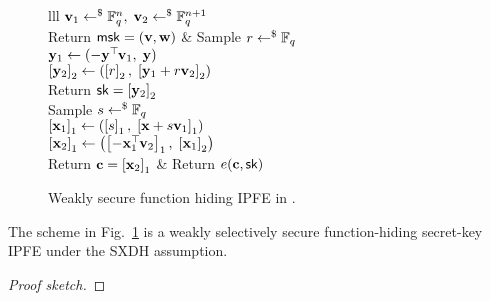 \begin{figure}[htb]
\centering
\begin{pcarray}{lll}
		{
			$\vc{v}_1 \rgets \F_q^n, \; \vc{v}_2 \rgets \F_q^{n+1}$
				\\
			Return $\msk = (\vc{v}, \vc{w})$
 		}
	&
		{
			Sample $r \rgets \F_q$
				\\
			$\vc{y}_1 \gets (-\vc{y}^\trs \vc{v}_1, \; \vc{y})$
				\\
			$\gexp{2}{\vc{y}_2} \gets \left(\gexp{2}{r}, \; \gexp{2}{\vc{y}_1 + r \vc{v}_2}\right)$
				\\
			Return $\sk = \gexp{2}{\vc{y}_2}$
		}
	\\
		{
			Sample $s \rgets \F_q$
				\\
			$\gexp{1}{\vc{x}_1} \gets \left( \gexp{1}{s},\; \gexp{1}{\vc{x} + s \vc{v}_1} \right)$
				\\
			$\gexp{1}{\vc{x}_2} \gets \left( \gexp{1}{-\vc{x}_1^\trs \vc{v}_2},\; \gexp{2}{\vc{x}_1} \right)$
				\\
			Return $\vc{c} = \gexp{1}{\vc{x}_2}$
		}
	&
		{
			Return $e(\vc{c}, \sk)$
		}
\end{pcarray}
\caption{Weakly secure function hiding IPFE in \cite{C:Lin17}.}
\label{prot:Lin17:wfh_IPFE}
\end{figure}

\begin{proposition}
	The scheme in Fig.~\ref{prot:Lin17:wfh_IPFE} is a weakly selectively secure function-hiding secret-key IPFE under the SXDH assumption. 
\end{proposition}
\begin{proof}[Proof sketch]
\end{proof}